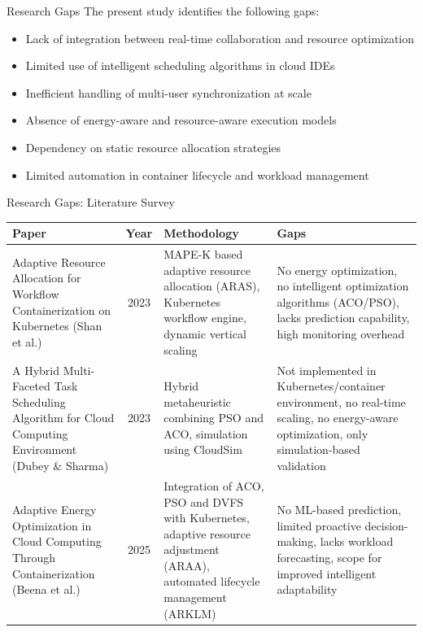 \documentclass[aspectratio=169,11pt]{beamer}
\begin{document}
\begin{frame}{Research Gaps}
  The present study identifies the following gaps:
  \begin{itemize}
    \item Lack of integration between real-time collaboration and resource optimization
    \item Limited use of intelligent scheduling algorithms in cloud IDEs
    \item Inefficient handling of multi-user synchronization at scale
    \item Absence of energy-aware and resource-aware execution models
    \item Dependency on static resource allocation strategies
    \item Limited automation in container lifecycle and workload management
  \end{itemize}
\end{frame}

\begin{frame}[shrink=6]{Research Gaps: Literature Survey}
  \tiny
  \renewcommand{\arraystretch}{1.25}
  \begin{tabularx}{\textwidth}{>{\raggedright\arraybackslash}p{3.1cm}c>{\raggedright\arraybackslash}X>{\raggedright\arraybackslash}X}
    \toprule
    \textbf{Paper} & \textbf{Year} & \textbf{Methodology} & \textbf{Gaps}\\
    \midrule
    Adaptive Resource Allocation for Workflow Containerization on Kubernetes (Shan et al.) & 2023 &
    MAPE-K based adaptive resource allocation (ARAS), Kubernetes workflow engine, dynamic vertical scaling &
    No energy optimization, no intelligent optimization algorithms (ACO/PSO), lacks prediction capability, high monitoring overhead\\
    \addlinespace
    A Hybrid Multi-Faceted Task Scheduling Algorithm for Cloud Computing Environment (Dubey \& Sharma) & 2023 &
    Hybrid metaheuristic combining PSO and ACO, simulation using CloudSim &
    Not implemented in Kubernetes/container environment, no real-time scaling, no energy-aware optimization, only simulation-based validation\\
    \addlinespace
    Adaptive Energy Optimization in Cloud Computing Through Containerization (Beena et al.) & 2025 &
    Integration of ACO, PSO and DVFS with Kubernetes, adaptive resource adjustment (ARAA), automated lifecycle management (ARKLM) &
    No ML-based prediction, limited proactive decision-making, lacks workload forecasting, scope for improved intelligent adaptability\\
    \bottomrule
  \end{tabularx}
\end{frame}
\end{document}
